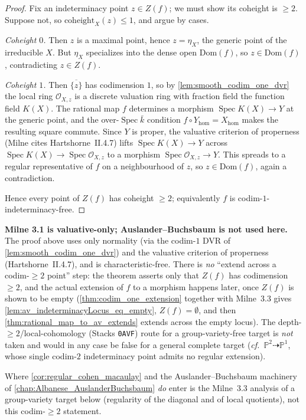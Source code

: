 \begin{proof}\leanok
  Fix an indeterminacy point \(z \in Z(f)\); we must show its coheight is \(\geq 2\).
  Suppose not, so \(\mathrm{coheight}_X(z) \leq 1\), and argue by cases.

  \emph{Coheight \(0\).} Then \(z\) is a maximal point, hence \(z = \eta_X\), the generic
  point of the irreducible \(X\). But \(\eta_X\) specializes into the dense open
  \(\mathrm{Dom}(f)\), so \(z \in \mathrm{Dom}(f)\), contradicting \(z \in Z(f)\).

  \emph{Coheight \(1\).} Then \(\overline{\{z\}}\) has codimension \(1\), so by
  \cref{lem:smooth_codim_one_dvr} the local ring \(\mathcal O_{X, z}\) is a discrete
  valuation ring with fraction field the function field \(K(X)\). The rational map \(f\)
  determines a morphism \(\operatorname{Spec} K(X) \to Y\) at the generic point, and the
  over-\(\operatorname{Spec}\bar k\) condition \(f \circ Y_{\mathrm{hom}} =
  X_{\mathrm{hom}}\) makes the resulting square commute. Since \(Y\) is proper, the
  valuative criterion of properness (Milne cites Hartshorne~II.4.7) lifts
  \(\operatorname{Spec} K(X) \to Y\) across \(\operatorname{Spec} K(X) \to
  \operatorname{Spec}\mathcal O_{X, z}\) to a morphism \(\operatorname{Spec}
  \mathcal O_{X, z} \to Y\). This spreads to a regular representative of \(f\) on a
  neighbourhood of \(z\), so \(z \in \mathrm{Dom}(f)\), again a contradiction.

  Hence every point of \(Z(f)\) has coheight \(\geq 2\); equivalently \(f\) is
  codim-\(1\)-indeterminacy-free.
\end{proof}

\begin{remark}
  \label{rmk:codim1_role_of_ab}
  \textbf{Milne 3.1 is valuative-only; Auslander--Buchsbaum is not used here.} The proof
  above uses only normality (via the codim-\(1\) DVR of \cref{lem:smooth_codim_one_dvr})
  and the valuative criterion of properness (Hartshorne~II.4.7), and is
  characteristic-free. There is \emph{no} ``extend across a codim-\(\geq 2\) point'' step:
  the theorem asserts only that \(Z(f)\) has codimension \(\geq 2\), and the actual
  extension of \(f\) to a morphism happens later, once \(Z(f)\) is shown to be empty
  (\cref{thm:codim_one_extension} together with Milne~3.3 gives
  \cref{lem:av_indeterminacyLocus_eq_empty}, \(Z(f) = \emptyset\), and then
  \cref{thm:rational_map_to_av_extends} extends across the empty locus). The
  depth-\(\geq 2\)/local-cohomology (Stacks \texttt{0AVF}) route for a group-variety-free
  target is \emph{not} taken and would in any case be false for a general complete target
  (\emph{cf.}\ \(\mathbb P^2 \dashrightarrow \mathbb P^1\), whose single codim-\(2\)
  indeterminacy point admits no regular extension).

  Where \cref{cor:regular_cohen_macaulay} and the Auslander--Buchsbaum machinery of
  \cref{chap:Albanese_AuslanderBuchsbaum} \emph{do} enter is the Milne~3.3 analysis of a
  group-variety target below (regularity of the diagonal and of local quotients), not
  this codim-\(\geq 2\) statement.
\end{remark}

